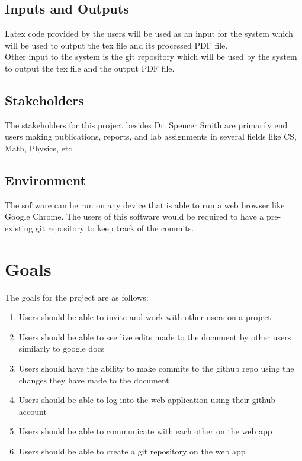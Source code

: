 \documentclass{article}
\begin{document}
\subsection{Inputs and Outputs}

Latex code provided by the users will be used as an input for the system which will be used to output the tex file and its processed PDF file.\\
Other input to the system is the git repository which will be used by the system to output the tex file and the output PDF file.

\subsection{Stakeholders}

The stakeholders for this project besides Dr. Spencer Smith are primarily end users making publications, reports, and lab assignments in several fields like CS, Math, Physics, etc. 

\subsection{Environment}

The software can be run on any device that is able to run a web browser like Google Chrome. The users of this software would be required to have a pre-existing git repository to keep track of the commits. 

\section{Goals}

The goals for the project are as follows:

\begin{enumerate}
	\item Users should be able to invite and work with other users on a project
	\item Users should be able to see live edits made to the document by other users similarly to google docs
	\item Users should have the ability to make commits to the github repo using the changes they have made to the document
	\item Users should be able to log into the web application using their github account
	\item Users should be able to communicate with each other on the web app
        \item Users should be able to create a git repository on the web app
\end{enumerate}
\end{document}
